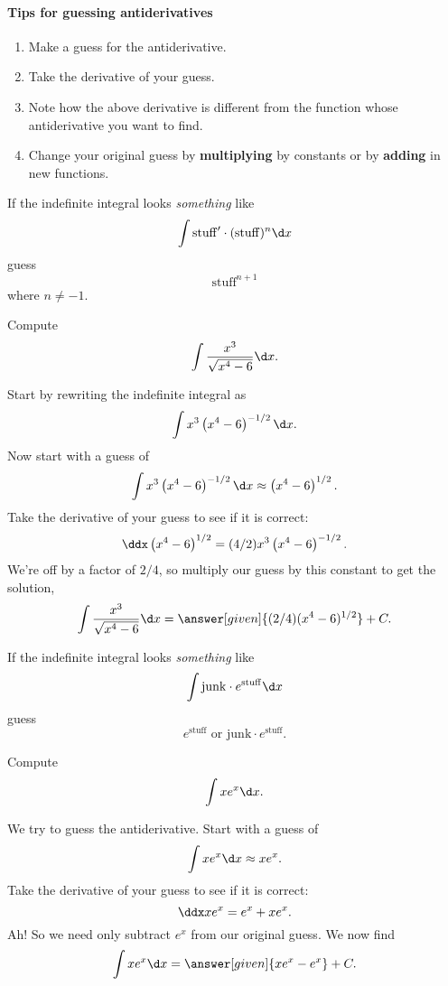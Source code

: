 \documentclass{ximera}
\begin{document}
\paragraph{Tips for guessing antiderivatives}
\begin{enumerate}
\item Make a guess for the antiderivative.
\item Take the derivative of your guess.
\item Note how the above derivative is different from the function
  whose antiderivative you want to find.
\item Change your original guess by \textbf{multiplying} by constants
  or by \textbf{adding} in new functions.
\end{enumerate}

\begin{template}\label{template:powerchain}
If the indefinite integral looks \emph{something} like
\[
\int \mathrm{stuff}' \cdot (\mathrm{stuff})^n \d x
\]
guess
\[
\mathrm{stuff}^{n+1}
\]
where $n\ne -1$.
\end{template}

\begin{example} Compute
\[
\int \frac{x^3}{\sqrt{x^4 -6}} \d x.
\]
\begin{explanation}
  Start by rewriting the indefinite integral as
  \[
  \int x^3\left(x^4 -6\right)^{-1/2} \d x.
  \]
  Now start with a guess of 
  \[
  \int x^3\left(x^4 -6\right)^{-1/2} \d x \approx \left(x^4 -6\right)^{1/2}.
  \]
  Take the derivative of your guess to see if it is correct:
  \[
  \ddx  \left(x^4 -6\right)^{1/2} = (4/2)x^3\left(x^4 -6\right)^{-1/2}.
  \]
  We're off by a factor of $2/4$, so multiply our guess by this constant
  to get the solution,
  \[
  \int \frac{x^3}{\sqrt{x^4 -6}} \d x = \answer[given]{(2/4)(x^4 -6)^{1/2}}+C.
  \]
\end{explanation}
\end{example}


\begin{template}\label{template:echain}
If the indefinite integral looks \emph{something} like
\[
\int \mathrm{junk}\cdot e^{\mathrm{stuff}} \d x
\]
guess
\[
e^{\mathrm{stuff}} \text{ or }\mathrm{junk} \cdot e^{\mathrm{stuff}}.
\]
\end{template}


\begin{example}
Compute
\[
\int xe^{x} \d x.
\]
\begin{explanation}
We try to guess the antiderivative. Start with a guess of
\[
\int xe^x \d x \approx xe^x.
\]
Take the derivative of your guess to see if it is correct:
\[
\ddx xe^x = e^x + xe^x.
\]
Ah! So we need only subtract $e^x$ from our original guess.  We now
find
\[
\int xe^x \d x =\answer[given]{xe^x - e^x} + C.
\]
\end{explanation}
\end{example}
\end{document}
